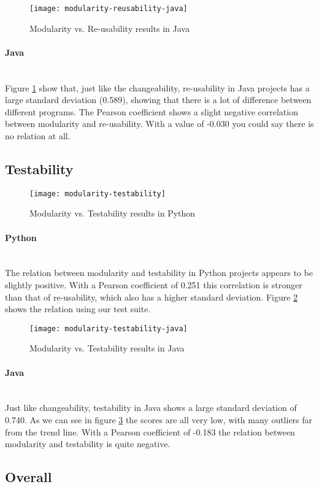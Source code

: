\documentclass[twoside]{uva-inf-bachelor-thesis}
\newcommand{\myparagraph}[1]{\paragraph{#1}\mbox{}\\}
\begin{document}
\begin{figure}[H]
    \caption{Modularity vs. Re-usability results in Java}
    \label{figure:mod-reuse-java}
    \centering
        \texttt{[image: modularity-reusability-java]}
\end{figure}

\myparagraph{Java}
Figure \ref{figure:mod-reuse-java} show that, just like the changeability, re-usability in Java projects has a large standard deviation (0.589), showing that there is a lot of difference between different programs. The Pearson coefficient shows a slight negative correlation between modularity and re-usability. With a value of -0.030 you could say there is no relation at all.

\subsection{Testability}

\begin{figure}[H]
    \caption{Modularity vs. Testability results in Python}
    \label{figure:mod-test}
    \centering
        \texttt{[image: modularity-testability]}
\end{figure}

\myparagraph{Python}
The relation between modularity and testability in Python projects appears to be slightly positive. With a Pearson coefficient of 0.251 this correlation is stronger than that of re-usability, which also has a higher standard deviation. Figure \ref{figure:mod-test} shows the relation using our test suite.

\begin{figure}[H]
    \caption{Modularity vs. Testability results in Java}
    \label{figure:mod-test-java}
    \centering
        \texttt{[image: modularity-testability-java]}
\end{figure}

\myparagraph{Java}
Just like changeability, testability in Java shows a large standard deviation of 0.740. As we can see in figure \ref{figure:mod-test-java} the scores are all very low, with many outliers far from the trend line. With a Pearson coefficient of -0.183 the relation between modularity and testability is quite negative.

\subsection{Overall}
\end{document}
